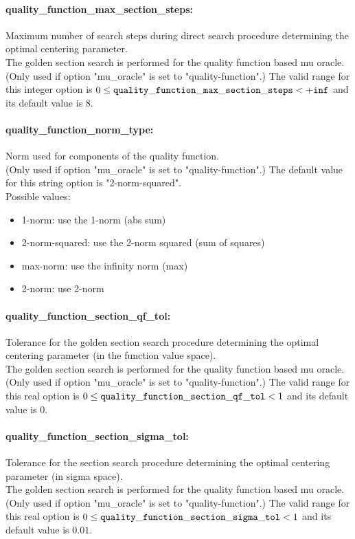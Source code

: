 \paragraph{quality\_function\_max\_section\_steps:}\label{sec:quality_function_max_section_steps} Maximum number of search steps during direct search procedure determining the optimal centering parameter. $\;$ \\
 The golden section search is performed for the
quality function based mu oracle. (Only used if
option "mu\_oracle" is set to "quality-function".) The valid range for this integer option is
$0 \le {\tt quality\_function\_max\_section\_steps } <  {\tt +inf}$
and its default value is $8$.


\paragraph{quality\_function\_norm\_type:}\label{sec:quality_function_norm_type} Norm used for components of the quality function. $\;$ \\
 (Only used if option "mu\_oracle" is set to
"quality-function".)
The default value for this string option is "2-norm-squared".
\\ 
Possible values:
\begin{itemize}
   \item 1-norm: use the 1-norm (abs sum)
   \item 2-norm-squared: use the 2-norm squared (sum of squares)
   \item max-norm: use the infinity norm (max)
   \item 2-norm: use 2-norm
\end{itemize}

\paragraph{quality\_function\_section\_qf\_tol:}\label{sec:quality_function_section_qf_tol} Tolerance for the golden section search procedure determining the optimal centering parameter (in the function value space). $\;$ \\
 The golden section search is performed for the
quality function based mu oracle. (Only used if
option "mu\_oracle" is set to "quality-function".) The valid range for this real option is 
$0 \le {\tt quality\_function\_section\_qf\_tol } <  1$
and its default value is $0$.


\paragraph{quality\_function\_section\_sigma\_tol:}\label{sec:quality_function_section_sigma_tol} Tolerance for the section search procedure determining the optimal centering parameter (in sigma space). $\;$ \\
 The golden section search is performed for the
quality function based mu oracle. (Only used if
option "mu\_oracle" is set to "quality-function".) The valid range for this real option is 
$0 \le {\tt quality\_function\_section\_sigma\_tol } <  1$
and its default value is $0.01$.


